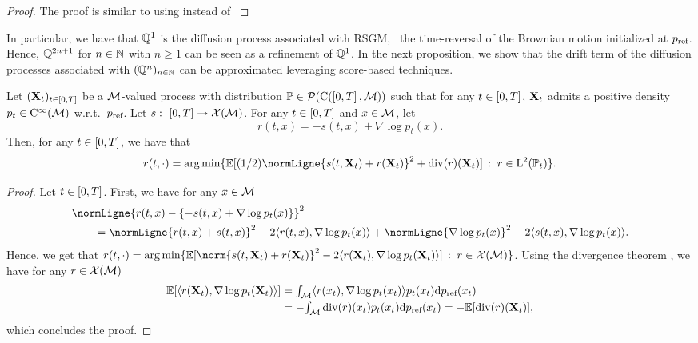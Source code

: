 \begin{proof}
  The proof is similar to \citet[Proposition 6]{debortoli2021neurips} using
   instead of \citet[Theorem
  4.19]{cattiaux2021time}
\end{proof}

In particular, we have that $\mathbb{Q}^1$ is the diffusion process associated with
RSGM, \ie \ the time-reversal of the Brownian motion initialized at
$p_{\textup{ref}}$. Hence, $\mathbb{Q}^{2n+1}$ for $n \in \mathbb{N}$ with $n \geq 1$ can be seen as
a refinement of $\mathbb{Q}^1$. In the next proposition, we show that the drift term
of the diffusion processes associated with $(\mathbb{Q}^n)_{n \in \mathbb{N}}$ can be
approximated leveraging score-based techniques.

\begin{proposition}
  \label{prop:loss_implicit_explicit}
  Let $(\mathbf{X}_t)_{t \in \left[0,T\right]}$ be a $\mathcal M$-valued process with distribution
  $\mathbb{P} \in \mathcal{P}(\mathrm{C}(\left[0,T\right], \mathcal M))$ such that for any $t \in \left[0,T\right]$,
  $\mathbf{X}_t$ admits a positive density $p_t \in \mathrm{C}^\infty(\mathcal M)$
  w.r.t.\ $p_{\textup{ref}}$. Let $s: \ \ccint{0,T} \to \XM$. For any $t \in \left[0,T\right]$
  and $x \in \mathcal M$, let
  \begin{equation}
    r(t,x) = -s(t,x) + \nabla \log p_t(x) . 
  \end{equation}
  Then, for any $t \in \left[0,T\right]$, we have that
  \begin{equation}
    r(t, \cdot) = \argmin \ensembleLigne{\expeLigne{(1/2)\normLigne{s(t, \bfX_t) + r(\bfX_t)}^2 + \dive(r)(\bfX_t)}}{r \in \mathrm{L}^2(\Pbb_t)} . 
  \end{equation}
\end{proposition}

\begin{proof}
  Let $t \in \left[0,T\right]$. First, we have for any $x \in \mathcal M$
  \begin{align}
    &\normLigne{r(t,x) - \{-s(t,x) + \nabla \log p_t(x) \}}^2\\
    & \qquad = \normLigne{r(t,x) + s(t, x)}^2 -2 \langle r(t,x), \nabla \log p_t(x) \rangle + \normLigne{\nabla \log p_t(x)}^2 - 2 \langle s(t,x), \nabla \log p_t(x) \rangle . 
  \end{align}
  Hence, we get that
  $r(t, \cdot) = \argmin \ensembleLigne{\expeLigne{\norm{s(t, \bfX_t) +
        r(\bfX_t)}^2 - 2 \langle r(\bfX_t), \nabla \log p_t(\bfX_t) \rangle}}{r
    \in \XM}$.
Using the
      divergence theorem \cite[see][p.51]{lee2018introduction}, we have for any $r \in \mathcal{X}(\mathcal{M})$
      \begin{align}
        \mathbb{E} [ \langle r(\mathbf{X}_t), \nabla \log p_t(\mathbf{X}_t) \rangle ] &= \textstyle{\int_\mathcal M\langle r(x_t), \nabla \log p_t(x_t) \rangle p_t(x_t) \mathrm{d}p_{\textup{ref}}(x_t)} \\
                                                                       &= - \textstyle{\int_\mathcal M\mathrm{div}(r)(x_t)  p_t(x_t) \mathrm{d}p_{\textup{ref}}(x_t) = -\mathbb{E}[ \mathrm{div}(r)(\mathbf{X}_t) ]}  ,
      \end{align}
which concludes the proof.  
\end{proof}




